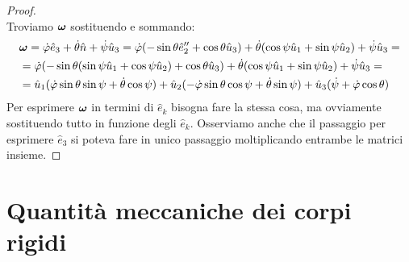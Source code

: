 \begin{proof}
\begin{equation}
    \end{equation}
    Troviamo $\boldsymbol{\omega}$ sostituendo e sommando:
    \begin{equation}
        \begin{aligned}
            &\boldsymbol{\omega} = \dot{\varphi}\hat{e}_3+\dot{\theta}\hat{n}+\dot{\psi}\hat{u}_3 = \dot{\varphi}(-\sin\theta \hat{e}''_2+\cos\theta \hat{u}_3)+\dot{\theta}(\cos \psi \hat{u}_1 +\sin\psi \hat{u}_2)+\dot{\psi}\hat{u}_3=\\
            &=\dot{\varphi}(-\sin\theta (\sin\psi \hat{u}_1+\cos\psi\hat{u}_2) +\cos\theta \hat{u}_3)+\dot{\theta}(\cos \psi \hat{u}_1 +\sin\psi \hat{u}_2)+\dot{\psi}\hat{u}_3=\\
            &=\hat{u}_1(\dot{\varphi}\sin\theta\sin\psi +\dot{\theta}\cos\psi)+\hat{u}_2(-\dot{\varphi}\sin\theta\cos\psi+\dot{\theta}\sin\psi)+\hat{u}_3(\dot{\psi}+\dot{\varphi}\cos\theta)
        \end{aligned}
    \end{equation}
    Per esprimere $\boldsymbol{\omega}$ in termini di $\hat{e}_k$ bisogna fare la stessa cosa, ma ovviamente sostituendo tutto in funzione degli $\hat{e}_k$. Osserviamo anche che il passaggio per esprimere $\hat{e}_3$ si poteva fare in unico passaggio moltiplicando entrambe le matrici insieme.
\end{proof}


    
    \section{Quantità meccaniche dei corpi rigidi}
